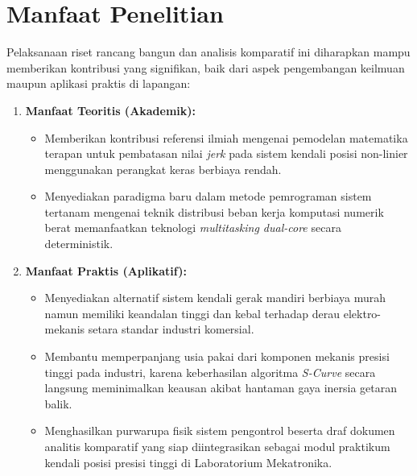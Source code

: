 \section{Manfaat Penelitian}
Pelaksanaan riset rancang bangun dan analisis komparatif ini diharapkan mampu memberikan kontribusi yang signifikan, baik dari aspek pengembangan keilmuan maupun aplikasi praktis di lapangan:
\begin{enumerate}
    \item \textbf{Manfaat Teoritis (Akademik):}
    \begin{itemize}
        \item Memberikan kontribusi referensi ilmiah mengenai pemodelan matematika terapan untuk pembatasan nilai \textit{jerk} pada sistem kendali posisi non-linier menggunakan perangkat keras berbiaya rendah.
        \item Menyediakan paradigma baru dalam metode pemrograman sistem tertanam mengenai teknik distribusi beban kerja komputasi numerik berat memanfaatkan teknologi \textit{multitasking dual-core} secara deterministik.
    \end{itemize}
    \item \textbf{Manfaat Praktis (Aplikatif):}
    \begin{itemize}
        \item Menyediakan alternatif sistem kendali gerak mandiri berbiaya murah namun memiliki keandalan tinggi dan kebal terhadap derau elektro-mekanis setara standar industri komersial.
        \item Membantu memperpanjang usia pakai dari komponen mekanis presisi tinggi pada industri, karena keberhasilan algoritma \textit{S-Curve} secara langsung meminimalkan keausan akibat hantaman gaya inersia getaran balik.
        \item Menghasilkan purwarupa fisik sistem pengontrol beserta draf dokumen analitis komparatif yang siap diintegrasikan sebagai modul praktikum kendali posisi presisi tinggi di Laboratorium Mekatronika.
    \end{itemize}
\end{enumerate}
